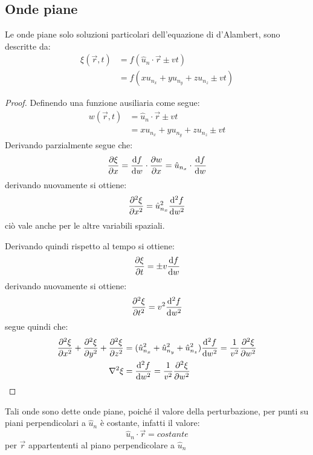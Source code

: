 \documentclass[11pt, a4paper, openright]{book}
\theoremstyle{plain}
\theoremstyle{definition}
\begin{document}
\subsection{Onde piane}
Le onde piane solo soluzioni particolari dell'equazione di d'Alambert, sono descritte da:
\begin{align}
    \xi(\vec{r}, t) & = f(\hat{u}_n \cdot \vec{r} \pm vt) \\
                    & = f(xu_{n_x} + yu_{n_y} + zu_{n_z} \pm vt)
\end{align}
\begin{proof}
    Definendo una funzione ausiliaria come segue:
    \begin{align}
        w(\vec{r}, t) & = \hat{u}_n \cdot \vec{r} \pm vt \\
                      & = xu_{n_x} + yu_{n_y} + zu_{n_z} \pm vt
    \end{align}
    Derivando parzialmente segue che:
    \begin{align}
        \pdv{\xi}{x} = \dv{f}{w} \cdot \pdv{w}{x} = \hat{u}_{n_x} \cdot \dv{f}{w}
    \end{align}
    derivando nuovamente si ottiene:
    \begin{equation}
        \pdv[2]{\xi}{x} = \hat{u}_{n_x}^2 \dv[2]{f}{w}
    \end{equation}
    ciò vale anche per le altre variabili spaziali.
    
    Derivando quindi rispetto al tempo si ottiene:
    \begin{equation}
        \pdv{\xi}{t} = \pm v \dv{f}{w}
    \end{equation}
    derivando nuovamente si ottiene:
    \begin{equation}
        \pdv[2]{\xi}{t} = v^2 \dv[2]{f}{w}        
    \end{equation}
    segue quindi che:
    \begin{align}
        \pdv[2]{\xi}{x} + \pdv[2]{\xi}{y} + \pdv[2]{\xi}{z} & = (\hat{u}_{n_x}^2 + \hat{u}_{n_y}^2 + \hat{u}_{n_z}^2) \dv[2]{f}{w} = \frac{1}{v^2}\pdv[2]{\xi}{w} \\
        \nabla^2 \xi & = \dv[2]{f}{w} = \frac{1}{v^2} \pdv[2]{\xi}{w}
    \end{align}
\end{proof}
Tali onde sono dette onde piane, poiché il valore della perturbazione, per punti su piani perpendicolari a $\hat{u}_n$ è costante, infatti il valore:
\begin{equation}
    \hat{u}_n \cdot \vec{r} = costante
\end{equation}
per $\vec{r}$ appartententi al piano perpendicolare a $\hat{u}_n$
\end{document}
